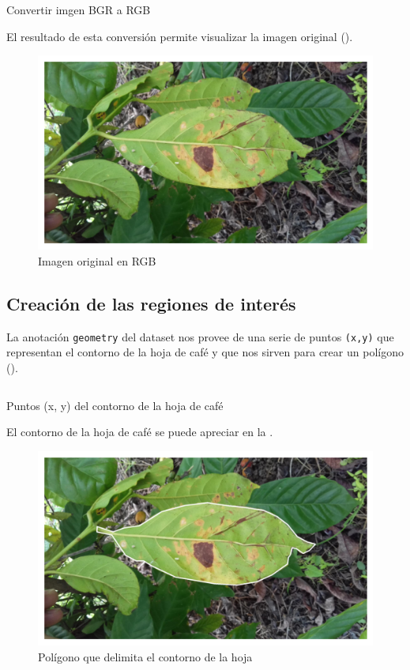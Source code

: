 \begin{listing}[!ht]
\inputminted{python}{code_listings/bgr_to_rgb.py}
\caption{Convertir imgen BGR a RGB}
\label{code:bgr_to_rgb}
\end{listing}

El resultado de esta conversión permite visualizar la imagen original ().

\begin{figure}[!ht]
\centering
\includegraphics[scale=1]{images/original_image.png}
\caption{Imagen original en RGB}
\label{img:original}
\end{figure}

\subsection{Creación de las regiones de interés}
La anotación \texttt{geometry} del dataset nos provee de una serie de puntos \texttt{(x,y)} que representan el contorno de la hoja de café y que nos sirven para crear un polígono ().

\begin{listing}[!ht]
\inputminted{python}{code_listings/polygon.py}
\caption{Puntos (x, y) del contorno de la hoja de café}
\label{code:polygon}
\end{listing}

El contorno de la hoja de café se puede apreciar en la .

\begin{figure}[!ht]
\centering
\includegraphics[scale=1]{images/polygon.png}
\caption{Polígono que delimita el contorno de la hoja}
\label{img:polygon}
\end{figure}

